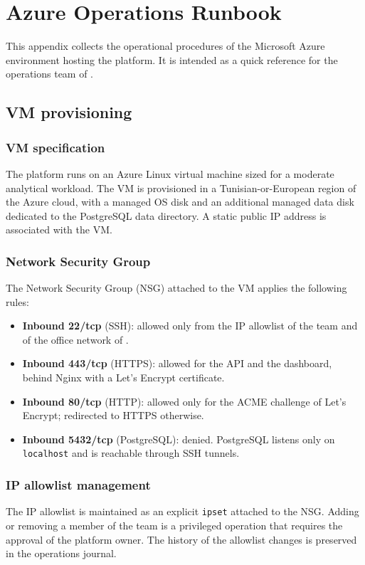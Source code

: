 \chapter{Azure Operations Runbook}
\label{app:azure}

This appendix collects the operational procedures of the Microsoft Azure environment hosting the platform. It is intended as a quick reference for the operations team of \hostorg.

\section{VM provisioning}

\subsection{VM specification}
The platform runs on an Azure Linux virtual machine sized for a moderate analytical workload. The VM is provisioned in a Tunisian-or-European region of the Azure cloud, with a managed OS disk and an additional managed data disk dedicated to the PostgreSQL data directory. A static public IP address is associated with the VM.

\subsection{Network Security Group}
The Network Security Group (NSG) attached to the VM applies the following rules:

\begin{itemize}
    \item \textbf{Inbound 22/tcp} (SSH): allowed only from the IP allowlist of the team and of the office network of \hostorg.
    \item \textbf{Inbound 443/tcp} (HTTPS): allowed for the API and the dashboard, behind Nginx with a Let's Encrypt certificate.
    \item \textbf{Inbound 80/tcp} (HTTP): allowed only for the ACME challenge of Let's Encrypt; redirected to HTTPS otherwise.
    \item \textbf{Inbound 5432/tcp} (PostgreSQL): denied. PostgreSQL listens only on \texttt{localhost} and is reachable through SSH tunnels.
\end{itemize}

\subsection{IP allowlist management}
The IP allowlist is maintained as an explicit \texttt{ipset} attached to the NSG. Adding or removing a member of the team is a privileged operation that requires the approval of the platform owner. The history of the allowlist changes is preserved in the operations journal.

